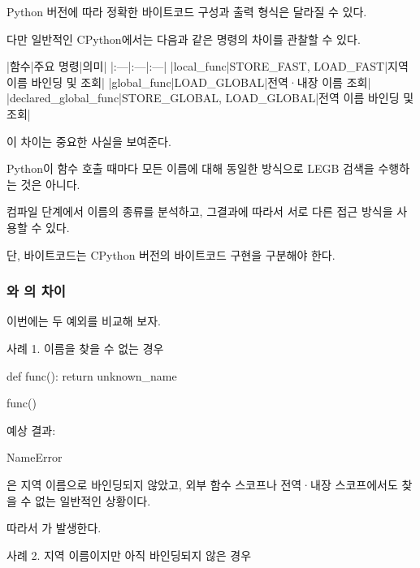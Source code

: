 Python 버전에 따라 정확한 바이트코드 구성과 출력 형식은 달라질 수 있다.

다만 일반적인 CPython에서는 다음과 같은 명령의 차이를 관찰할 수 있다.

\begin{dhktable}
|함수|주요 명령|의미|
|:---|:---|:---|
|local_func|STORE_FAST, LOAD_FAST|지역 이름 바인딩 및 조회|
|global_func|LOAD_GLOBAL|전역·내장 이름 조회|
|declared_global_func|STORE_GLOBAL, LOAD_GLOBAL|전역 이름 바인딩 및 조회|
\end{dhktable}

이 차이는 중요한 사실을 보여준다.

Python이 함수 호출 때마다 모든 이름에 대해 동일한 방식으로 LEGB 검색을 수행하는 것은 아니다.

컴파일 단계에서 이름의 종류를 분석하고, 그결과에 따라서 서로 다른 접근 방식을 사용할 수 있다.

단, 바이트코드는 CPython 버전의 바이트코드 구현을 구분해야 한다.

\subsubsection{와 의 차이}

이번에는 두 예외를 비교해 보자.

\begin{dhknote}
\begin{dhksmry}[centered]
사례 1. 이름을 찾을 수 없는 경우
\end{dhksmry}
\end{dhknote}

\begin{dhkcode}
def func():
    return unknown_name

func()
\end{dhkcode}

예상 결과:

\begin{dhkzsh}
NameError
\end{dhkzsh}

은 지역 이름으로 바인딩되지 않았고, 외부 함수 스코프나 전역·내장 스코프에서도 찾을 수 없는 일반적인 상황이다.

따라서 가 발생한다.

\begin{dhknote}
\begin{dhksmry}[centered]
사례 2. 지역 이름이지만 아직 바인딩되지 않은 경우
\end{dhksmry}
\end{dhknote}

